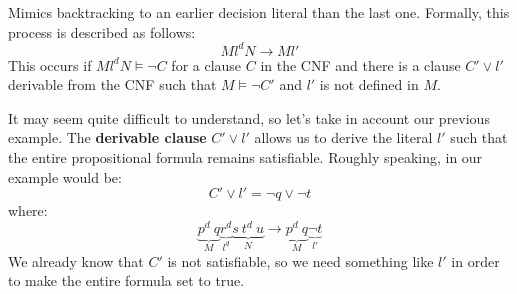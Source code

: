 Mimics backtracking to an earlier decision literal than the last one. Formally, this process is described as follows:
$$ Ml^dN \rightarrow Ml' $$
This occurs if $Ml^dN \models \neg C$ for a clause $C$ in the CNF and there is a clause $C' \vee l'$ derivable from the CNF such that $M \models \neg C'$ and $l'$
is not defined in $M$. \vspace{7pt}

It may seem quite difficult to understand, so let's take in account our previous example. The \textbf{derivable clause} $C' \vee l'$ allows us to derive 
the literal $l'$ such that the entire propositional formula remains satisfiable. Roughly speaking, in our example would be:
$$ C' \vee l' = \neg q \vee \neg t $$
where:
$$ \underbrace{p^d \ q}_{M} \underbrace{r^d}_{l^d} \underbrace{s \ t^d \ u}_{N} \rightarrow \underbrace{p^d \ q}_{M} \underbrace{\neg t}_{l'}$$
We already know that $C'$ is not satisfiable, so we need something like $l'$ in order to make the entire formula set to true. \vspace{7pt}